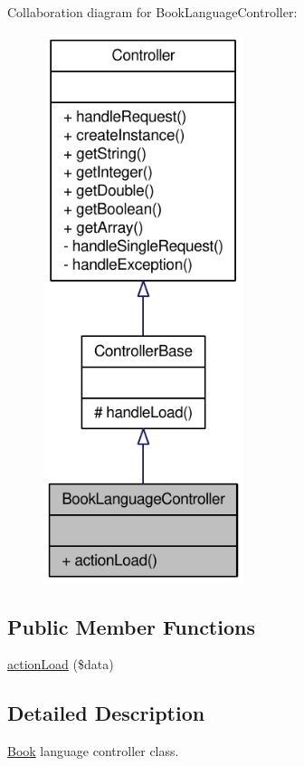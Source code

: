 Collaboration diagram for BookLanguageController:\nopagebreak
\begin{figure}[H]
\begin{center}
\leavevmode
\includegraphics[width=166pt]{classBookLanguageController__coll__graph}
\end{center}
\end{figure}
\subsection*{Public Member Functions}
\begin{DoxyCompactItemize}
\item 
\hyperlink{classBookLanguageController_a6e15611d07adc945762254f82efeec8f}{actionLoad} (\$data)
\end{DoxyCompactItemize}


\subsection{Detailed Description}
\hyperlink{classBook}{Book} language controller class. 

